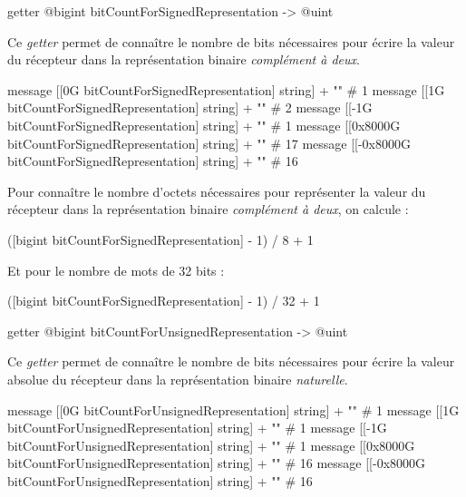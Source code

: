 
\begin{galgasbox}
getter @bigint bitCountForSignedRepresentation -> @uint
\end{galgasbox}

Ce \emph{getter} permet de connaître le nombre de bits nécessaires pour écrire la valeur du récepteur dans la représentation binaire \emph{complément à deux}.

\begin{galgas}
message [[0G bitCountForSignedRepresentation] string] + "\n" # 1
message [[1G bitCountForSignedRepresentation] string] + "\n" # 2
message [[-1G bitCountForSignedRepresentation] string] + "\n" # 1
message [[0x8000G bitCountForSignedRepresentation] string] + "\n" # 17
message [[-0x8000G bitCountForSignedRepresentation] string] + "\n" # 16
\end{galgas}


Pour connaître le nombre d'octets nécessaires pour représenter la valeur du récepteur dans la représentation binaire \emph{complément à deux}, on calcule :
\begin{galgas}
([bigint bitCountForSignedRepresentation] - 1) / 8 + 1 
\end{galgas}

Et pour le nombre de mots de 32 bits :
\begin{galgas}
([bigint bitCountForSignedRepresentation] - 1) / 32 + 1 
\end{galgas}




\begin{galgasbox}
getter @bigint bitCountForUnsignedRepresentation -> @uint
\end{galgasbox}

Ce \emph{getter} permet de connaître le nombre de bits nécessaires pour écrire la valeur absolue du récepteur dans la représentation binaire \emph{naturelle}. 

\begin{galgas}
message [[0G bitCountForUnsignedRepresentation] string] + "\n" # 1
message [[1G bitCountForUnsignedRepresentation] string] + "\n" # 1
message [[-1G bitCountForUnsignedRepresentation] string] + "\n" # 1
message [[0x8000G bitCountForUnsignedRepresentation] string] + "\n" # 16
message [[-0x8000G bitCountForUnsignedRepresentation] string] + "\n" # 16
\end{galgas}

